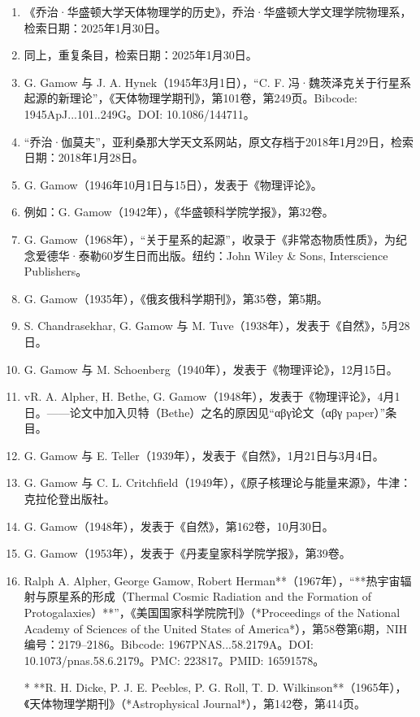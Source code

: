 \begin{enumerate}
\item 《乔治·华盛顿大学天体物理学的历史》，乔治·华盛顿大学文理学院物理系，检索日期：2025年1月30日。
\item 同上，重复条目，检索日期：2025年1月30日。
\item G. Gamow 与 J. A. Hynek（1945年3月1日），“C. F. 冯·魏茨泽克关于行星系起源的新理论”，《天体物理学期刊》，第101卷，第249页。Bibcode: 1945ApJ...101..249G。DOI: 10.1086/144711。
\item “乔治·伽莫夫”，亚利桑那大学天文系网站，原文存档于2018年1月29日，检索日期：2018年1月28日。
\item G. Gamow（1946年10月1日与15日），发表于《物理评论》。
\item 例如：G. Gamow（1942年），《华盛顿科学院学报》，第32卷。
\item G. Gamow（1968年），“关于星系的起源”，收录于《非常态物质性质》，为纪念爱德华·泰勒60岁生日而出版。纽约：John Wiley & Sons, Interscience Publishers。
\item G. Gamow（1935年），《俄亥俄科学期刊》，第35卷，第5期。
\item S. Chandrasekhar, G. Gamow 与 M. Tuve（1938年），发表于《自然》，5月28日。
\item G. Gamow 与 M. Schoenberg（1940年），发表于《物理评论》，12月15日。
\item vR. A. Alpher, H. Bethe, G. Gamow（1948年），发表于《物理评论》，4月1日。——论文中加入贝特（Bethe）之名的原因见“αβγ论文（αβγ paper）”条目。
\item G. Gamow 与 E. Teller（1939年），发表于《自然》，1月21日与3月4日。
\item G. Gamow 与 C. L. Critchfield（1949年），《原子核理论与能量来源》，牛津：克拉伦登出版社。
\item G. Gamow（1948年），发表于《自然》，第162卷，10月30日。
\item G. Gamow（1953年），发表于《丹麦皇家科学院学报》，第39卷。


\item Ralph A. Alpher, George Gamow, Robert Herman**（1967年），“**热宇宙辐射与原星系的形成（Thermal Cosmic Radiation and the Formation of Protogalaxies）**”，《美国国家科学院院刊》（*Proceedings of the National Academy of Sciences of the United States of America*），第58卷第6期，NIH编号：2179–2186。Bibcode: 1967PNAS...58.2179A。DOI: 10.1073/pnas.58.6.2179。PMC: 223817。PMID: 16591578。

* **R. H. Dicke, P. J. E. Peebles, P. G. Roll, T. D. Wilkinson**（1965年），《天体物理学期刊》（*Astrophysical Journal*），第142卷，第414页。


\end{enumerate}
